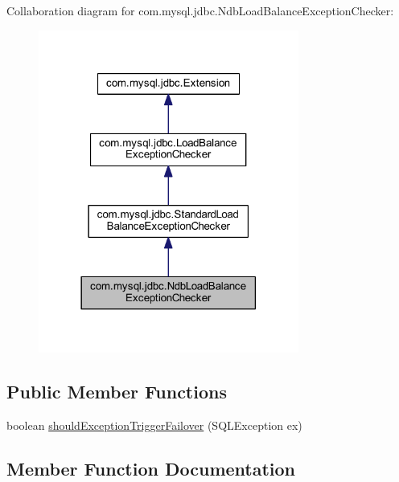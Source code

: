 Collaboration diagram for com.\+mysql.\+jdbc.\+Ndb\+Load\+Balance\+Exception\+Checker\+:
\nopagebreak
\begin{figure}[H]
\begin{center}
\leavevmode
\includegraphics[width=242pt]{classcom_1_1mysql_1_1jdbc_1_1_ndb_load_balance_exception_checker__coll__graph}
\end{center}
\end{figure}
\subsection*{Public Member Functions}
\begin{DoxyCompactItemize}
\item 
boolean \mbox{\hyperlink{classcom_1_1mysql_1_1jdbc_1_1_ndb_load_balance_exception_checker_a07072cfa83f0942761b59015dbefc25e}{should\+Exception\+Trigger\+Failover}} (S\+Q\+L\+Exception ex)
\end{DoxyCompactItemize}


\subsection{Member Function Documentation}
\mbox{\label{classcom_1_1mysql_1_1jdbc_1_1_ndb_load_balance_exception_checker_a07072cfa83f0942761b59015dbefc25e}} 
